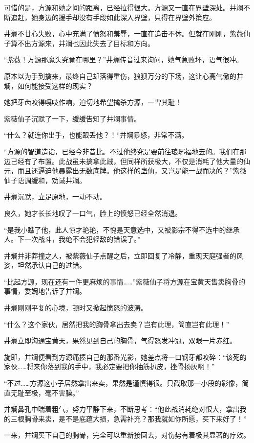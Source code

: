 \begin{this_body}
可惜的是，方源和她之间的距离，已经拉得很大。方源又一直在界壁深处。井斓不断追赶，她身边的援手却没有手段如此深入界壁，只得在界壁外策应。

井斓不甘心失败，心中充满了愤怒和羞辱，一直在追击不休。但就在刚刚，紫薇仙子算不出方源来，井斓也因此失去了目标和方向。

“紫薇！方源那魔头究竟在哪里？”井斓传音过来询问，她气急败坏，语气很冲。

原本以为手到擒来，最终自己却落得重伤，狼狈万分的下场，这让心高气傲的井斓，如何能接受这样的现实？

她把牙齿咬得嘎吱作响，迫切地希望擒杀方源，一雪其耻！

紫薇仙子沉默了一下，缓缓告知了井斓事情。

“什么？就连你出手，也能跟丢他？！”井斓暴怒，非常不满。

“方源的智道造诣，已经今非昔比。不过他终究是要前往琅琊福地去的。我们在那边已经有了布置。此战虽未擒拿此贼，但同样所获极大，不仅是消耗了他大量的仙元，而且还逼迫他暴露出无数底牌。他这样的蛊仙，又岂是能一战而决的？”紫薇仙子语调缓和，劝诫井斓。

井斓沉默，立足原地，一动不动。

良久，她才长长地叹了一口气，脸上的愤怒已经全然消退。

“是我小瞧了他，此人惊才艳艳，不愧是天意选中，又被影宗不得不选中的继承人。下一次战斗，我绝不会犯轻敌的错误了。”

井斓并非莽撞之人，被紫薇仙子点醒之后，立即回复了冷静，重现天庭强者的风姿，坦然承认自己的过错。

“比起方源，现在还有一件更麻烦的事情……”紫薇仙子将方源在宝黄天售卖胸骨的事情，委婉地告诉了井斓。

井斓刚刚平复的心境，顿时又掀起愤怒的波涛。

“什么？这个家伙，居然把我的胸骨拿出去卖？岂有此理，简直岂有此理！”

井斓立即沟通宝黄天，果然见到自己的胸骨，气得怒发冲冠，双眼一片赤红。

旋即，井斓便看到方源痛揍自己的那番光影，她差点将一口钢牙都咬碎：“该死的家伙……将来你落到我的手中，我必定要把你抽筋扒皮，挫骨扬灰啊！”

“不过……方源这小子居然拿出来卖，果然是谨慎得很。只截取那一小段的影像，简直无耻至极，毫不害臊。”

井斓鼻孔中喘着粗气，努力平静下来，不断思考：“他此战消耗绝对很大，拿出我的三根胸骨来卖，是不是底蕴大损，急需补充？那我就如你所愿，买下来好了！”

一来，井斓买下自己的胸骨，完全可以重新接回去，对伤势有着极其显著的疗效。


\end{this_body}
